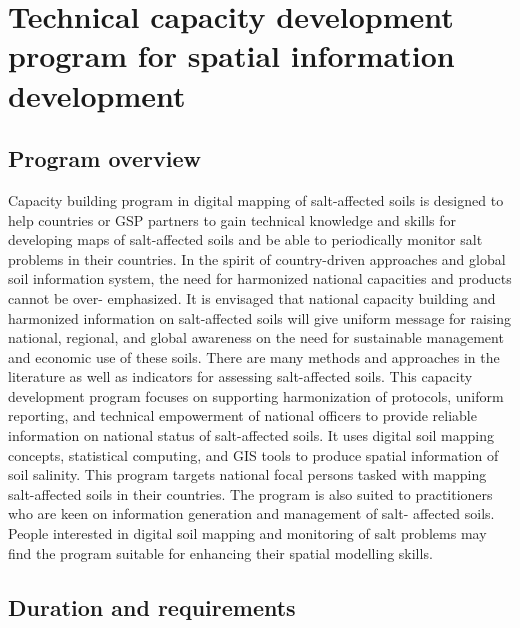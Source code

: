 \documentclass[
  10pt,
  b5paper,
]{book}
\begin{document}
\hypertarget{technical-capacity-development-program-for-spatial-information-development}{%
\section{Technical capacity development program for spatial information development}\label{technical-capacity-development-program-for-spatial-information-development}}

\hypertarget{program-overview}{%
\subsection{Program overview}\label{program-overview}}

Capacity building program in digital mapping of salt-affected soils is designed to help countries or GSP partners to gain technical knowledge and skills for developing maps of salt-affected soils and be able to periodically monitor salt problems in their countries. In the spirit of country-driven approaches and global soil information system, the need for harmonized national capacities and products cannot be over- emphasized. It is envisaged that national capacity building and harmonized information on salt-affected soils will give uniform message for raising national, regional, and global awareness on the need for sustainable management and economic use of these soils.
There are many methods and approaches in the literature as well as indicators for assessing salt-affected soils. This capacity development program focuses on supporting harmonization of protocols, uniform reporting, and technical empowerment of national officers to provide reliable information on national status of salt-affected soils. It uses digital soil mapping concepts, statistical computing, and GIS tools to produce spatial information of soil salinity.
This program targets national focal persons tasked with mapping salt-affected soils in their countries. The program is also suited to practitioners who are keen on information generation and management of salt- affected soils. People interested in digital soil mapping and monitoring of salt problems may find the program suitable for enhancing their spatial modelling skills.

\hypertarget{duration-and-requirements}{%
\subsection{Duration and requirements}\label{duration-and-requirements}}
\end{document}
